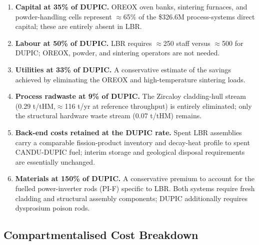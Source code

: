 \begin{enumerate}
    \item \textbf{Capital at 35\% of DUPIC.}
          OREOX oven banks, sintering furnaces, and powder-handling
          cells represent $\approx$65\% of the \$326.6M
          process-systems direct capital; these are entirely absent
          in LBR.

    \item \textbf{Labour at 50\% of DUPIC.}
          LBR requires $\approx$250 staff versus $\approx$500 for
          DUPIC; OREOX, powder, and sintering operators are
          not needed.

    \item \textbf{Utilities at 33\% of DUPIC.}
          A conservative estimate of the savings achieved by
          eliminating the OREOX and high-temperature sintering loads.

    \item \textbf{Process radwaste at 9\% of DUPIC.}
          The Zircaloy cladding-hull stream
          (0.29 t/tHM,$\approx$116 t/yr at reference throughput)
          is entirely eliminated; only the structural hardware waste
          stream (0.07 t/tHM) remains.

    \item \textbf{Back-end costs retained at the DUPIC rate.}
          Spent LBR assemblies carry a comparable fission-product
          inventory and decay-heat profile to spent CANDU-DUPIC fuel;
          interim storage and geological disposal requirements are
          essentially unchanged.

    \item \textbf{Materials at 150\% of DUPIC.}
          A conservative premium to account for the fuelled
          power-inverter rods (PI-F) specific to LBR.
          Both systems require fresh cladding and structural
          assembly components; DUPIC additionally requires dysprosium
          poison rods.
\end{enumerate}

\subsection{Compartmentalised Cost Breakdown}

